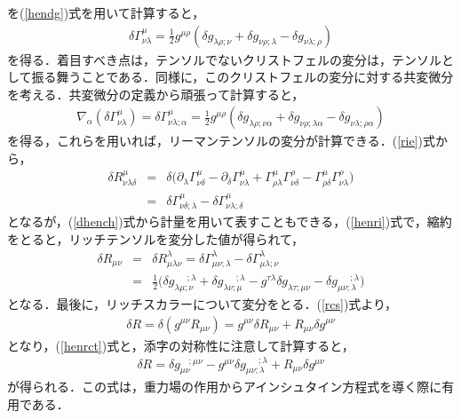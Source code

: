を(\ref{hendg})式を用いて計算すると，
\begin{eqnarray}
\delta \Gamma^{\mu}_{\nu\lambda}=\frac{1}{2}g^{\mu\rho}(\delta g_{\lambda\rho;\nu}+\delta g_{\nu\rho;\lambda} -\delta g_{\nu\lambda;\rho})
\end{eqnarray}
を得る．着目すべき点は，テンソルでないクリストフェルの変分は，テンソルとして振る舞うことである．同様に，このクリストフェルの変分に対する共変微分を考える．共変微分の定義から頑張って計算すると，
\begin{eqnarray}
\label{dhench}
\nabla_{\alpha}(\delta \Gamma^{\mu}_{\nu\lambda})=\delta \Gamma^{\mu}_{\nu\lambda;\alpha}=\frac{1}{2}g^{\mu\rho}(\delta g_{\lambda\rho;\nu\alpha}+\delta g_{\nu\rho;\lambda\alpha} -\delta g_{\nu\lambda;\rho\alpha})
\end{eqnarray}
を得る，これらを用いれば，リーマンテンソルの変分が計算できる．(\ref{rie})式から，
\begin{eqnarray}
\label{henri}
\delta R^{\mu}_{\nu\lambda\delta}&=&\delta\biggl(\partial_{\lambda}\Gamma^{\mu}_{\nu\delta}-\partial_{\delta}\Gamma^{\mu}_{\nu\lambda}+\Gamma^{\mu}_{\rho\lambda}\Gamma^{\rho}_{\nu\delta}-\Gamma^{\mu}_{\rho\delta}\Gamma^{\rho}_{\nu\lambda}
\biggr)\nonumber \\
&=&\delta\Gamma^{\mu}_{\nu\delta;\lambda}-\delta\Gamma^{\mu}_{\nu\lambda;\delta}
\end{eqnarray}
となるが，(\ref{dhench})式から計量を用いて表すこともできる，(\ref{henri})式で，縮約をとると，リッチテンソルを変分した値が得られて，
\begin{eqnarray}
\label{henrct}
\delta R_{\mu\nu}&=&\delta R^{\lambda}_{\mu\lambda\nu}=\delta\Gamma^{\lambda}_{\mu\nu;\lambda}-\delta\Gamma^{\lambda}_{\mu\lambda;\nu}\nonumber \\
&=&\frac{1}{2}\biggl(\delta g_{\lambda\mu;\nu}^{\quad \ \  ;\lambda}+\delta g_{\lambda\nu;\mu}^{\quad \ \  ;\lambda}-g^{\tau\lambda}\delta g_{\lambda\tau;\mu\nu}-\delta g_{\mu\nu;\lambda}^{\quad \ \  ;\lambda}\biggr)
\end{eqnarray}
となる．最後に，リッチスカラーについて変分をとる．(\ref{rcs})式より，
\begin{eqnarray}
\delta R=\delta(g^{\mu\nu}R_{\mu\nu})=g^{\mu\nu}\delta R_{\mu\nu}+R_{\mu\nu}\delta g^{\mu\nu}
\end{eqnarray}
となり，(\ref{henrct})式と，添字の対称性に注意して計算すると，
\begin{eqnarray}
\delta R=\delta g_{\mu\nu}^{\quad ;\mu\nu}-g^{\mu\nu}\delta g_{\mu\nu;\lambda}^{\quad \ \ ;\lambda}+R_{\mu\nu}\delta g^{\mu\nu}
\end{eqnarray}
が得られる．この式は，重力場の作用からアインシュタイン方程式を導く際に有用である．
